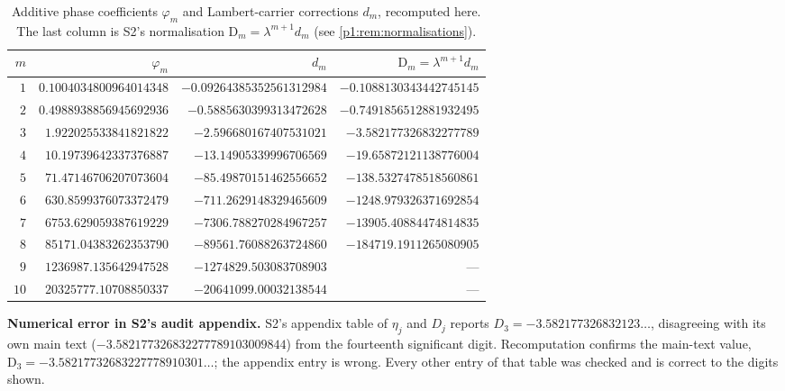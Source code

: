 \documentclass[11pt,a4paper,oneside]{book}
\theoremstyle{plain}
\theoremstyle{definition}
\theoremstyle{remark}
\begin{document}
\begin{table}[htbp]
\centering
\caption{Additive phase coefficients $\varphi_m$ and Lambert-carrier
corrections $d_m$, recomputed here.  The last column is
\textsf{S2}'s normalisation $\mathrm D_m=\lambda^{m+1}d_m$
(see \cref{p1:rem:normalisations}).}
\label{p1:tab:inverse}
\small
\setlength{\tabcolsep}{6pt}
\begin{tabular}{r@{\quad}r@{\qquad}r@{\qquad}r}
\toprule
$m$ & $\varphi_m$ & $d_m$ & $\mathrm D_m=\lambda^{m+1}d_m$\\
\midrule
$1$ & $0.1004034800964014348$ & $-0.09264385352561312984$ & $-0.1088130343442745145$\\
$2$ & $0.4988938856945692936$ & $-0.5885630399313472628$ & $-0.7491856512881932495$\\
$3$ & $1.922025533841821822$ & $-2.596680167407531021$ & $-3.582177326832277789$\\
$4$ & $10.19739642337376887$ & $-13.14905339996706569$ & $-19.65872121138776004$\\
$5$ & $71.47146706207073604$ & $-85.49870151462556652$ & $-138.5327478518560861$\\
$6$ & $630.8599376073372479$ & $-711.2629148329465609$ & $-1248.979326371692854$\\
$7$ & $6753.629059387619229$ & $-7306.788270284967257$ & $-13905.40884474814835$\\
$8$ & $85171.04383262353790$ & $-89561.76088263724860$ & $-184719.1911265080905$\\
$9$ & $1236987.135642947528$ & $-1274829.503083708903$ & ---\\
$10$ & $20325777.10708850337$ & $-20641099.00032138544$ & ---\\
\bottomrule
\end{tabular}
\end{table}

\begin{repairbox}
\textbf{Numerical error in \textsf{S2}'s audit appendix.}  \textsf{S2}'s appendix table of
$\eta_j$ and $D_j$ reports $D_3=-3.582177326832123\ldots$, disagreeing with its own main text
($-3.582177326832277789103009844$) from the fourteenth significant digit. Recomputation
confirms the main-text value, $\mathrm D_3=-3.58217732683227778910301\ldots$; the appendix
entry is wrong. Every other entry of that table was checked and is correct to the digits
shown.
\end{repairbox}
\end{document}

